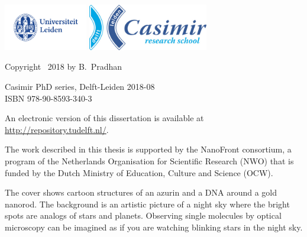 \begin{titlepage}
\vfill
\begin{center}
    \includegraphics[height=0.8in]{frontback/logos/leiden}
    \hspace{2em}
    \includegraphics[height=0.8in]{frontback/logos/casimir} \\
\end{center}
\vfill

\vspace{2\bigskipamount}

\noindent Copyright \textcopyright\ 2018 by B.~Pradhan


\medskip
\noindent Casimir PhD series, Delft-Leiden 2018-08 \\
\noindent ISBN 978-90-8593-340-3

\medskip
\noindent An electronic version of this dissertation is available at \\
\url{http://repository.tudelft.nl/}.

\medskip
\noindent The work described in this thesis is supported by the NanoFront consortium, a program of the Netherlands Organisation for Scientific Research (NWO) that is funded by the Dutch Ministry of Education, Culture and Science (OCW).

\medskip
\noindent The cover shows cartoon structures of an azurin and a DNA around a gold nanorod. The background is an artistic picture of a night sky where the bright spots are analogs of stars and planets. Observing single molecules by optical microscopy can be imagined as if you are watching blinking stars in the night sky.  

\end{titlepage}

